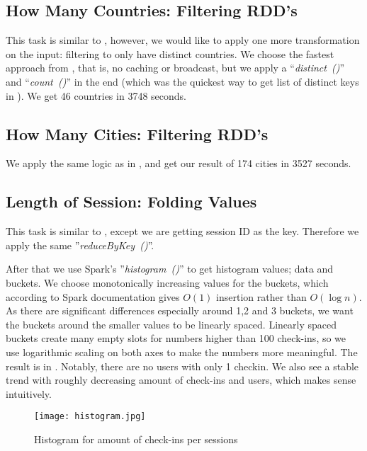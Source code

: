 

\subsection{How Many Countries: Filtering RDD's}\label{sec:countries}
This task is similar to , however, we would like to apply one more transformation on the input: filtering to only have distinct countries.
We choose the fastest approach from , that is, no caching or broadcast, but we apply a ``\textit{distinct~()}'' and ``\textit{count~()}'' in the end (which was the quickest way to get list of distinct keys in ). We get 46 countries in 3748 seconds.


\subsection{How Many Cities: Filtering RDD's}
We apply the same logic as in , and get our result of
174 cities in 3527 seconds.


\subsection{Length of Session: Folding Values}
This task is similar to , except we are getting session ID as the key. Therefore we apply the same ''\textit{reduceByKey~()}''.

After that we use Spark's ''\textit{histogram~()}'' to get histogram values; data and buckets. We choose monotonically increasing values for the buckets, which according to Spark documentation gives $O(1)$ 
insertion rather
than $O(\log{n})$. As there are significant differences especially around 1,2 and 3 buckets, we want the buckets around the smaller values to be linearly spaced. Linearly spaced buckets create many empty slots for numbers higher than 100 check-ins, so we use logarithmic scaling on both axes to make the numbers more meaningful. The result is in . Notably, there are no users with only 1 checkin. We also see a stable trend with roughly decreasing amount of check-ins and users, which makes sense intuitively.

\begin{figure}
    \centering
    \texttt{[image: histogram.jpg]}
\caption{Histogram for amount of check-ins per sessions}
\label{fig:histogram}
\end{figure}


